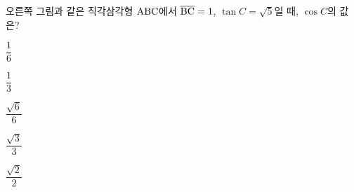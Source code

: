 \noindent\begin{minipage}[t]{0.58\linewidth}\vspace{0pt}\raggedright 오른쪽 그림과 같은 직각삼각형 $\mathrm{ABC}$에서 $\overline{\mathrm{BC}}=1$, $\tan C=\sqrt{5}$일 때, $\cos C$의 값은?\end{minipage}\hfill\begin{minipage}[t]{0.4\linewidth}\vspace{0pt}\centering \resizebox{\ifdim\width>\linewidth\linewidth\else\width\fi}{!}{}\end{minipage}\par
\begin{choicesii}{\rule[-3ex]{0pt}{8ex}$\dfrac{1}{6}$}{\rule[-3ex]{0pt}{8ex}$\dfrac{1}{3}$}{\rule[-3ex]{0pt}{8ex}$\dfrac{\sqrt{6}}{6}$}{\rule[-3ex]{0pt}{8ex}$\dfrac{\sqrt{3}}{3}$}{\rule[-3ex]{0pt}{8ex}$\dfrac{\sqrt{2}}{2}$}\end{choicesii}
